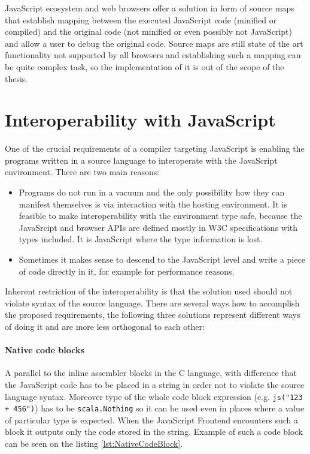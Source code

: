 \documentclass[12pt,a4paper]{report}
\begin{document}
JavaScript ecosystem and web browsers offer a solution in form of source maps \cite{SourceMaps} that establish mapping between the executed JavaScript code (minified or compiled) and the original code (not minified or even possibly not JavaScript) and allow a user to debug the original code. Source maps are still state of the art functionality not supported by all browsers and establishing such a mapping can be quite complex task, so the implementation of it is out of the scope of the thesis.

\section{Interoperability with JavaScript}

One of the crucial requirements of a compiler targeting JavaScript is enabling the programs written in a source language to interoperate with the JavaScript environment. There are two main reasons:

\begin{itemize} 
\item Programs do not run in a vacuum and the only possibility how they can manifest themselves is via interaction with the hosting environment. It is feasible to make interoperability with the environment type safe, because the JavaSrcipt and  browser APIs are defined mostly in W3C \cite{W3c} specifications with types included. It is JavaScript where the type information is lost. 
\item Sometimes it makes sense to descend to the JavaScript level and write a piece of code directly in it, for example for performance reasons. 
\end{itemize}

Inherent restriction of the interoperability is that the solution used should not violate syntax of the source language. There are several ways how to accomplish the proposed requirements, the following three solutions represent different ways of doing it and are more less orthogonal to each other: 

\paragraph{Native code blocks} A parallel to the inline assembler blocks in the C language, with difference that the JavaScript code has to be placed in a string in order not to violate the source language syntax. Moreover type of the whole code block expression (e.g. \texttt{js("123 + 456")}) has to be \texttt{scala.Nothing} so it can be used even in places where a value of particular type is expected. When the JavaScript Frontend encounters such a block it outputs only the code stored in the string. Example of such a code block can be seen on the listing \ref{lst:NativeCodeBlock}.
\end{document}
